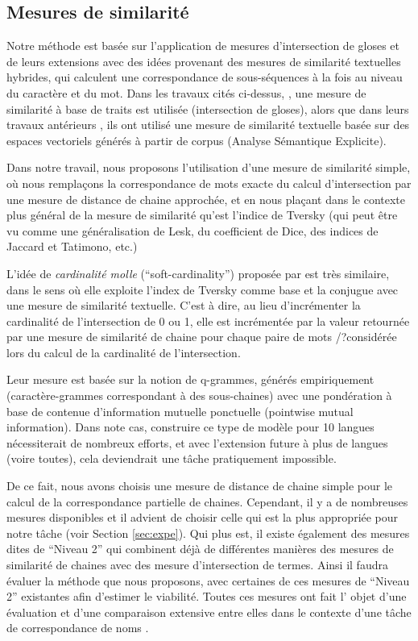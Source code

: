 \documentclass[10pt,a4paper,twoside]{article}
\begin{document}
\subsection{Mesures de similarité}
Notre méthode est basée sur l'application de mesures d'intersection de gloses et de leurs extensions avec des idées provenant des mesures de similarité textuelles hybrides, qui calculent une correspondance de sous-séquences à la fois au niveau du caractère et du mot. Dans les travaux cités ci-dessus, \cite{meyer-gurevych:2012:PAPERS}, une mesure de similarité à base de traits est utilisée (intersection de gloses), alors que dans leurs travaux antérieurs \cite{MeyerGurevych:2010}, ils ont utilisé une mesure de similarité textuelle basée sur des espaces vectoriels générés à partir de corpus (Analyse Sémantique Explicite).

Dans notre travail, nous proposons l'utilisation d'une mesure de similarité simple, où nous remplaçons la correspondance de mots exacte du calcul d'intersection par une mesure de distance de chaine approchée, et en nous plaçant dans le contexte plus général de la mesure de similarité qu'est l'indice de Tversky (qui peut être vu comme une généralisation de Lesk, du coefficient de Dice, des indices de Jaccard et Tatimono, etc.)

 L'idée de \emph{cardinalité molle} (``soft-cardinality'') proposée par \cite{Jimenez2010,Jimenez2012} est très similaire, dans le sens où elle exploite l'index de Tversky comme base et la conjugue avec une mesure de similarité textuelle. C'est à dire, au lieu d'incrémenter la cardinalité de l'intersection de 0 ou 1, elle est incrémentée par la valeur retournée par une mesure de similarité de chaine pour chaque paire de mots /?considérée lors du calcul de la cardinalité de l'intersection. 
 
  Leur mesure est basée sur la notion de q-grammes, générés empiriquement (caractère-grammes correspondant à des sous-chaines) avec une pondération à base de contenue d'information mutuelle ponctuelle (pointwise mutual information). Dans note cas, construire ce type de modèle pour 10 langues nécessiterait de nombreux efforts, et avec l'extension future à plus de langues (voire toutes), cela deviendrait une tâche pratiquement impossible. 
 
 De ce fait, nous avons choisis une mesure de distance de chaine simple pour le calcul de la correspondance partielle de chaines. Cependant, il y a de nombreuses mesures disponibles et il advient de choisir celle qui est la plus appropriée pour notre tâche (voir Section \ref{sec:expe}). Qui plus est, il existe également des mesures dites de ``Niveau 2'' qui combinent déjà de différentes manières des mesures de similarité de chaines avec des mesure d'intersection de termes. Ainsi il faudra évaluer la méthode que nous proposons, avec certaines de ces mesures de ``Niveau 2'' existantes afin d'estimer le viabilité. Toutes ces mesures ont fait l' objet d'une évaluation et d'une comparaison extensive entre elles dans le contexte d'une tâche de correspondance de noms \cite{Cohen2003}.
\end{document}
